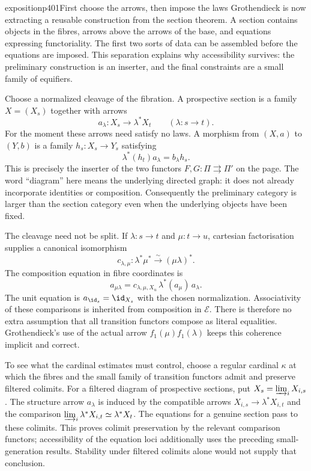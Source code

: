 \begin{dcomment}{exposition}{p401}{First choose the arrows, then impose the laws}
Grothendieck is now extracting a reusable construction from the section theorem. A section contains objects in the fibres, arrows above the arrows of the base, and equations expressing functoriality. The first two sorts of data can be assembled before the equations are imposed. This separation explains why accessibility survives: the preliminary construction is an inserter, and the final constraints are a small family of equifiers.

Choose a normalized cleavage of the fibration. A prospective section is a family $X=(X_s)$ together with arrows
\[
 a_\lambda:X_s\longrightarrow\lambda^*X_t
 \qquad(\lambda:s\longrightarrow t).
\]
For the moment these arrows need satisfy no laws. A morphism from $(X,a)$ to $(Y,b)$ is a family $h_s:X_s\to Y_s$ satisfying
\[
 \lambda^*(h_t)a_\lambda=b_\lambda h_s.
\]
This is precisely the inserter of the two functors $F,G:\Pi\rightrightarrows\Pi'$ on the page. The word ``diagram'' here means the underlying directed graph: it does not already incorporate identities or composition. Consequently the preliminary category is larger than the section category even when the underlying objects have been fixed.

The cleavage need not be split. If $\lambda:s\to t$ and $\mu:t\to u$, cartesian factorisation supplies a canonical isomorphism
\[
 c_{\lambda,\mu}:\lambda^*\mu^*\xrightarrow{\sim}(\mu\lambda)^*.
\]
The composition equation in fibre coordinates is
\[
 a_{\mu\lambda}
 =c_{\lambda,\mu,X_u}\,\lambda^*(a_\mu)\,a_\lambda.
\]
The unit equation is $a_{\id_s}=\id_{X_s}$ with the chosen normalization. Associativity of these comparisons is inherited from composition in $\mathcal E$. There is therefore no extra assumption that all transition functors compose as literal equalities. Grothendieck's use of the actual arrow $f_1(\mu)f_1(\lambda)$ keeps this coherence implicit and correct.

To see what the cardinal estimates must control, choose a regular cardinal $\kappa$ at which the fibres and the small family of transition functors admit and preserve filtered colimits. For a filtered diagram of prospective sections, put $X_s=\varinjlim_iX_{i,s}$. The structure arrow $a_\lambda$ is induced by the compatible arrows $X_{i,s}\to\lambda^*X_{i,t}$ and the comparison $\varinjlim_i\lambda^*X_{i,t}\simeq\lambda^*X_t$. The equations for a genuine section pass to these colimits. This proves colimit preservation by the relevant comparison functors; accessibility of the equation loci additionally uses the preceding small-generation results. Stability under filtered colimits alone would not supply that conclusion.


\end{dcomment}
